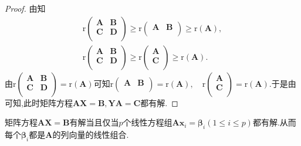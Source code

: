 \documentclass[../../main.tex]{subfiles}%
\begin{document}
\begin{proof}

由知
\begin{gather*}
\mathrm{r}\left( \begin{matrix}
\boldsymbol{A}&		\boldsymbol{B}\\
\boldsymbol{C}&		\boldsymbol{D}\\
\end{matrix} \right) \geqslant \mathrm{r}\left( \begin{matrix}
\boldsymbol{A}&		\boldsymbol{B}\\
\end{matrix} \right) \geqslant \mathrm{r}\left( \boldsymbol{A} \right) ,
\\
\mathrm{r}\left( \begin{matrix}
\boldsymbol{A}&		\boldsymbol{B}\\
\boldsymbol{C}&		\boldsymbol{D}\\
\end{matrix} \right) \geqslant \mathrm{r}\left( \begin{array}{c}
\boldsymbol{A}\\
\boldsymbol{C}\\
\end{array} \right) \geqslant \mathrm{r}\left( \boldsymbol{A} \right) .
\end{gather*}
由$\mathrm{r}\left( \begin{matrix}
\boldsymbol{A}&		\boldsymbol{B}\\
\boldsymbol{C}&		\boldsymbol{D}\\
\end{matrix} \right) =\mathrm{r}\left( \boldsymbol{A} \right)$可知$\mathrm{r}\left( \begin{matrix}
\boldsymbol{A}&		\boldsymbol{B}\\
\end{matrix} \right) =\mathrm{r}\left( \boldsymbol{A} \right) ,\quad \mathrm{r}\left( \begin{array}{c}
\boldsymbol{A}\\
\boldsymbol{C}\\
\end{array} \right) =\mathrm{r}\left( \boldsymbol{A} \right).$于是由可知,此时矩阵方程\(\boldsymbol{AX}=\boldsymbol{B},\boldsymbol{YA}=\boldsymbol{C}\)都有解.

\end{proof}

\begin{proposition}
矩阵方程\(\boldsymbol{A}\boldsymbol{X}=\boldsymbol{B}\)有解当且仅当\(p\)个线性方程组\(\boldsymbol{A}\boldsymbol{x}_i=\boldsymbol{\beta}_i(1\leqslant  i\leqslant  p)\)都有解.从而每个\(\boldsymbol{\beta}_i\)都是\(\boldsymbol{A}\)的列向量的线性组合.
\end{proposition}
\end{document}
